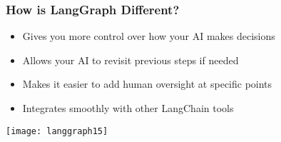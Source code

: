\begin{frame}[fragile]\frametitle{How is LangGraph Different?}


      \begin{itemize}
        \item Gives you more control over how your AI makes decisions
        \item Allows your AI to revisit previous steps if needed
        \item Makes it easier to add human oversight at specific points
        \item Integrates smoothly with other LangChain tools
      \end{itemize}


\begin{center}
\texttt{[image: langgraph15]}
\end{center}

  

\end{frame}

